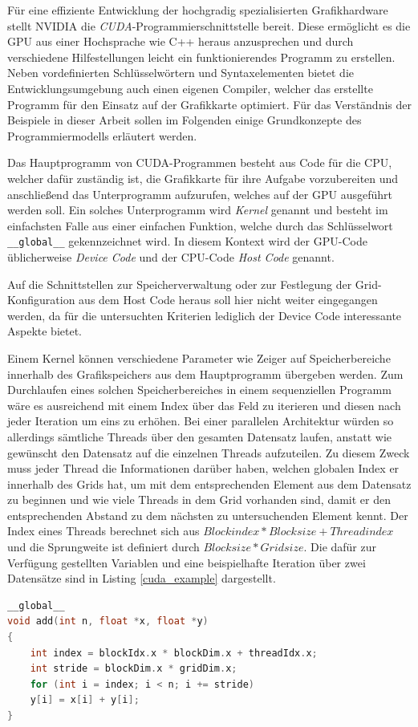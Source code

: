 Für eine effiziente Entwicklung der hochgradig spezialisierten Grafikhardware stellt NVIDIA die \emph{CUDA}-Programmierschnittstelle bereit.
Diese ermöglicht es die GPU aus einer Hochsprache wie C++ heraus anzusprechen und durch verschiedene Hilfestellungen leicht ein funktionierendes Programm zu erstellen.
Neben vordefinierten Schlüsselwörtern und Syntaxelementen bietet die Entwicklungsumgebung auch einen eigenen Compiler, welcher das erstellte Programm für den Einsatz auf der Grafikkarte optimiert.
Für das Verständnis der Beispiele in dieser Arbeit sollen im Folgenden einige Grundkonzepte des Programmiermodells erläutert werden.

Das Hauptprogramm von CUDA-Programmen besteht aus Code für die CPU, welcher dafür zuständig ist, die Grafikkarte für ihre Aufgabe vorzubereiten und anschließend das Unterprogramm aufzurufen, welches auf der GPU ausgeführt werden soll.
Ein solches Unterprogramm wird \emph{Kernel} genannt und besteht im einfachsten Falle aus einer einfachen Funktion, welche durch das Schlüsselwort \texttt{\_\_global\_\_} gekennzeichnet wird.
In diesem Kontext wird der GPU-Code üblicherweise \emph{Device Code} und der CPU-Code \emph{Host Code} genannt.

Auf die Schnittstellen zur Speicherverwaltung oder zur Festlegung der Grid-Konfiguration aus dem Host Code heraus soll hier nicht weiter eingegangen werden, da für die untersuchten Kriterien lediglich der Device Code interessante Aspekte bietet.

Einem Kernel können verschiedene Parameter wie Zeiger auf Speicherbereiche innerhalb des Grafikspeichers aus dem Hauptprogramm übergeben werden.
Zum Durchlaufen eines solchen Speicherbereiches in einem sequenziellen Programm wäre es ausreichend mit einem Index über das Feld zu iterieren und diesen nach jeder Iteration um eins zu erhöhen.
Bei einer parallelen Architektur würden so allerdings sämtliche Threads über den gesamten Datensatz laufen, anstatt wie gewünscht den Datensatz auf die einzelnen Threads aufzuteilen.
Zu diesem Zweck muss jeder Thread die Informationen darüber haben, welchen globalen Index er innerhalb des Grids hat, um mit dem entsprechenden Element aus dem Datensatz zu beginnen und wie viele Threads in dem Grid vorhanden sind, damit er den entsprechenden Abstand zu dem nächsten zu untersuchenden Element kennt.
Der Index eines Threads berechnet sich aus $Blockindex * Blocksize + Threadindex$ und die Sprungweite ist definiert durch $Blocksize * Gridsize$.
Die dafür zur Verfügung gestellten Variablen und eine beispielhafte Iteration über zwei Datensätze sind in Listing \ref{cuda_example} dargestellt.

\begin{lstlisting}[language=C++,
caption=Beispielhafter CUDA-Kernel zum Iterieren über zwei Datensätze \cite{Harris2017},
label=cuda_example]
__global__
void add(int n, float *x, float *y)
{
	int index = blockIdx.x * blockDim.x + threadIdx.x;
	int stride = blockDim.x * gridDim.x;
	for (int i = index; i < n; i += stride)
	y[i] = x[i] + y[i];
}
\end{lstlisting}